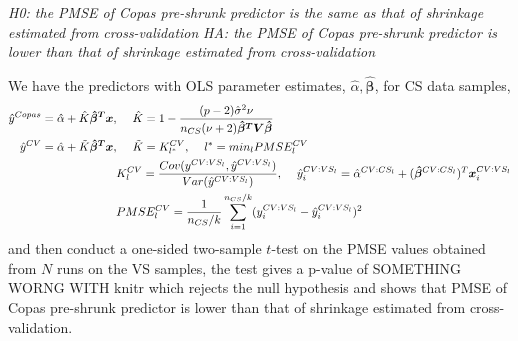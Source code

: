 \documentclass{article}
\newcommand{\rinline}[1]{SOMETHING WORNG WITH knitr}
\begin{document}
\hspace{12 pt} \textit{H0: the PMSE of Copas pre-shrunk predictor is
  the same as that of shrinkage estimated from cross-validation} \newline
\vspace{2 pt}
\hspace{24 pt} \textit{HA: the PMSE of Copas pre-shrunk predictor is
  lower than that of shrinkage estimated from cross-validation} \newline


We have the predictors with OLS parameter estimates, $\hat{\alpha},
\bm{\hat{\beta}}$, for CS data samples,
\begin{displaymath}
\begin{split}
\hat{y}^{Copas} &= \hat{\alpha} + \hat{K}\bm{\hat{\beta}^Tx},
\hspace{12 pt} \hat{K} = 1 -\frac{(p-2)\hat{\sigma}^2\nu}{n_{CS}(\nu+2)\bm{\hat{\beta}^TV\hat{\beta}}}\\
\hat{y}^{CV} &= \hat{\alpha} + \tilde{K}\bm{\hat{\beta}^Tx},
\hspace{12 pt} \tilde{K} = K^{CV}_{l^*}, \hspace{12 pt} l^* = min_lPMSE^{CV}_l\\
&\hspace{64 pt} K^{CV}_l = \frac{Cov(y^{CV:VS_l},  \hat{y}^{CV:VS_l})}{Var(\hat{y}^{CV:VS_l})},
\hspace{12 pt} \hat{y}^{CV:VS_l}_i = \hat{\alpha}^{CV:CS_l} + (\bm{\hat{\beta}}^{CV:CS_l})^T\bm{x}_i^{CV:VS_l}\\
&\hspace{64 pt} PMSE^{CV}_l = \frac{1}{n_{CS}/k} \sum_{i=1}^{n_{CS}/k} (y^{CV:VS_l}_i - \hat{y}^{CV:VS_l}_i)^2\\
\end{split}
\end{displaymath}
and then conduct a one-sided two-sample $t$-test on the PMSE values obtained
from $N$ runs on the VS samples, the test gives a p-value of 
\rinline{t.test(PMSE$copas, PMSE$crosval, alter = 'less')$p.value}
which rejects the null hypothesis and shows that PMSE of Copas
pre-shrunk predictor is lower than that of shrinkage estimated from cross-validation.


\end{document}

